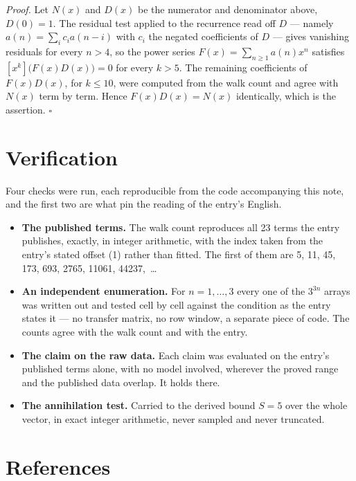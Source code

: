 \documentclass[11pt]{article}
\theoremstyle{definition}
\begin{document}
{\itshape Proof.} Let $N(x)$ and $D(x)$ be the numerator and denominator above, $D(0)=1$. The residual test applied to the recurrence read off $D$ --- namely $a(n) = \sum_i c_i a(n-i)$ with $c_i$ the negated coefficients of $D$ --- gives vanishing residuals for every $n > 4$, so the power series $F(x)=\sum_{n\ge 1}a(n)x^n$ satisfies $[x^k]\bigl(F(x)D(x)\bigr) = 0$ for every $k > 5$. The remaining coefficients of $F(x)D(x)$, for $k \le 10$, were computed from the walk count and agree with $N(x)$ term by term. Hence $F(x)D(x) = N(x)$ identically, which is the assertion. $\square$

\section{Verification}

Four checks were run, each reproducible from the code accompanying this note, and the first two are what pin the reading of the entry's English.

\begin{itemize}

\item {\bfseries The published terms.} The walk count reproduces all 23 terms the entry publishes, exactly, in integer arithmetic, with the index taken from the entry's stated offset (1) rather than fitted. The first of them are 5, 11, 45, 173, 693, 2765, 11061, 44237,~\dots

\item {\bfseries An independent enumeration.} For $n = 1,\dots,3$ every one of the $3^{3n}$ arrays was written out and tested cell by cell against the condition as the entry states it --- no transfer matrix, no row window, a separate piece of code. The counts agree with the walk count and with the entry.

\item {\bfseries The claim on the raw data.} Each claim was evaluated on the entry's published terms alone, with no model involved, wherever the proved range and the published data overlap. It holds there.

\item {\bfseries The annihilation test.} Carried to the derived bound $S = 5$ over the whole vector, in exact integer arithmetic, never sampled and never truncated.

\end{itemize}

\section{References}
\end{document}

